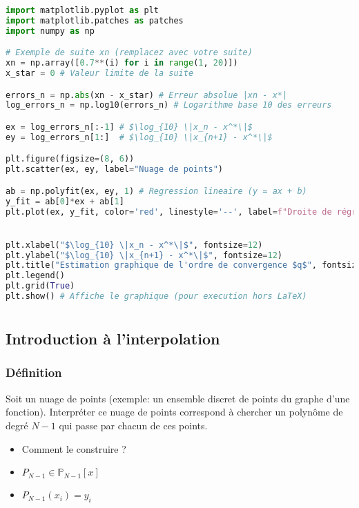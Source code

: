\documentclass[oneside]{book}
\begin{document}
\begin{lstlisting}[language=Python, caption=Code Python pour l'estimation de la convergence, label=lst:convergence_code]
import matplotlib.pyplot as plt
import matplotlib.patches as patches
import numpy as np

# Exemple de suite xn (remplacez avec votre suite)
xn = np.array([0.7**(i) for i in range(1, 20)])
x_star = 0 # Valeur limite de la suite

errors_n = np.abs(xn - x_star) # Erreur absolue |xn - x*|
log_errors_n = np.log10(errors_n) # Logarithme base 10 des erreurs

ex = log_errors_n[:-1] # $\log_{10} \|x_n - x^*\|$
ey = log_errors_n[1:]  # $\log_{10} \|x_{n+1} - x^*\|$

plt.figure(figsize=(8, 6))
plt.scatter(ex, ey, label="Nuage de points")

ab = np.polyfit(ex, ey, 1) # Regression lineaire (y = ax + b)
y_fit = ab[0]*ex + ab[1]
plt.plot(ex, y_fit, color='red', linestyle='--', label=f"Droite de régression: $y = {ab[0]:.2f}x + {ab[1]:.2f}$")


plt.xlabel("$\log_{10} \|x_n - x^*\|$", fontsize=12)
plt.ylabel("$\log_{10} \|x_{n+1} - x^*\|$", fontsize=12)
plt.title("Estimation graphique de l'ordre de convergence $q$", fontsize=14)
plt.legend()
plt.grid(True)
plt.show() # Affiche le graphique (pour execution hors LaTeX)
\end{lstlisting}\chapter{}
\sloppy

\section{Introduction à l'interpolation}

\subsection{Définition}

\begin{definition}
Soit un nuage de points (exemple: un ensemble discret de points du graphe d'une fonction). Interpréter ce nuage de points correspond à chercher un polynôme de degré $N-1$ qui passe par chacun de ces points.
\end{definition}

\begin{itemize}
    \item Comment le construire ?
    \item $P_{N-1} \in \mathbb{P}_{N-1}[x]$
    \item $P_{N-1}(x_i) = y_i$
\end{itemize}
\end{document}
